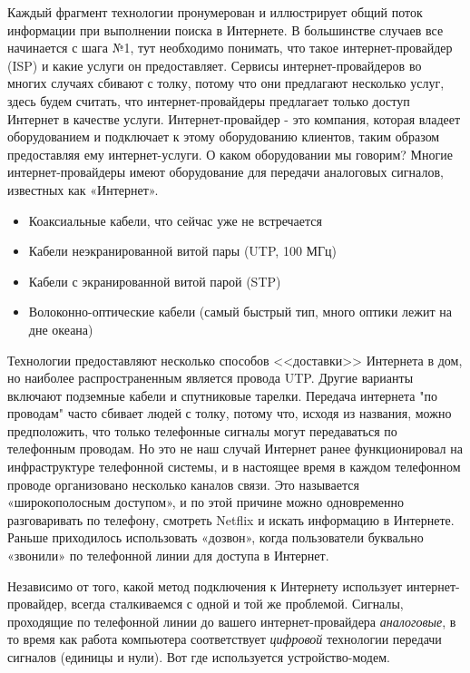 \documentclass[12pt]{article}
\providecommand{\tightlist}{%
  \setlength{\itemsep}{0pt}\setlength{\parskip}{0pt}}
\begin{document}
Каждый фрагмент технологии пронумерован и иллюстрирует общий поток
информации при выполнении поиска в Интернете. В большинстве случаев все
начинается с шага №1, тут необходимо понимать, что такое
интернет-провайдер (ISP) и какие услуги он предоставляет. Сервисы
интернет-провайдеров во многих случаях сбивают с толку, потому что они
предлагают несколько услуг, здесь будем считать, что интернет-провайдеры
предлагает только доступ Интернет в качестве услуги. Интернет-провайдер
- это компания, которая владеет оборудованием и подключает к этому
оборудованию клиентов, таким образом предоставляя ему интернет-услуги. О
каком оборудовании мы говорим? Многие интернет-провайдеры имеют
оборудование для передачи аналоговых сигналов, известных как «Интернет».

\begin{itemize}
\tightlist
\item
  Коаксиальные кабели, что сейчас уже не встречается
\item
  Кабели неэкранированной витой пары (UTP, 100 МГц)
\item
  Кабели с экранированной витой парой (STP)
\item
  Волоконно-оптические кабели (самый быстрый тип, много оптики лежит на
  дне океана)
\end{itemize}

Технологии предоставляют несколько способов <<доставки>> Интернета в дом,
но наиболее распространенным является провода UTP. Другие варианты
включают подземные кабели и спутниковые тарелки. Передача интернета "по
проводам" часто сбивает людей с толку, потому что, исходя из названия,
можно предположить, что только телефонные сигналы могут передаваться по
телефонным проводам. Но это не наш случай Интернет ранее функционировал
на инфраструктуре телефонной системы, и в настоящее время в каждом
телефонном проводе организовано несколько каналов связи. Это называется
«широкополосным доступом», и по этой причине можно одновременно
разговаривать по телефону, смотреть Netflix и искать информацию в
Интернете. Раньше приходилось использовать «дозвон», когда пользователи
буквально «звонили» по телефонной линии для доступа в Интернет.

Независимо от того, какой метод подключения к Интернету использует
интернет-провайдер, всегда сталкиваемся с одной и той же проблемой.
Сигналы, проходящие по телефонной линии до вашего интернет-провайдера
\emph{аналоговые}, в то время как работа компьютера соответствует
\emph{цифровой} технологии передачи сигналов (единицы и нули). Вот где
используется устройство-модем.
\end{document}
